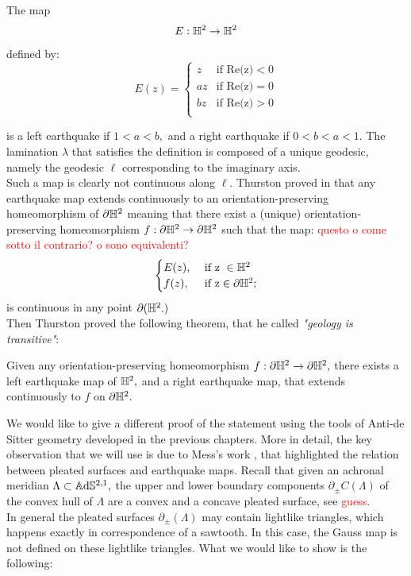 \begin{example}\label{simplequake}
The map 
\[
    E:\mathbb{H}^2\to\mathbb{H}^2
\]

defined by:
\[
  E(z)= \begin{cases}
    z & \text{if Re(z)}<0 \\
    az & \text{if Re(z)}=0 \\
    bz & \text{if Re(z)}>0 \\    
\end{cases}
\]

is a left earthquake if $1<a<b,$ and a right earthquake if $0<b<a<1$. The lamination $\lambda$ that satisfies the definition is composed of a unique geodesic, namely the geodesic $\ell$ corresponding to the imaginary axis. \\
Such a map is clearly not continuous along $\ell$.
Thurston proved in \cite{thurston1986earthquakes} that any earthquake map extends continuously to an orientation-preserving homeomorphism of $\partial\mathbb{H}^2$ meaning that there exist a (unique) orientation-preserving homeomorphism $f:\partial\mathbb{H}^2\to\partial\mathbb{H}^2$ such that the map: \textcolor{red}{questo o come sotto il contrario? o sono equivalenti?}
\[
    \begin{cases}
        E(z), &\text{ if z }\in \mathbb{H}^2\\
        f(z), &\text{ if z}\in \partial\mathbb{H}^2  ;\\
        
    \end{cases}
\]
is continuous in any point $\partial(\mathbb{H}^2.)$\\
Then Thurston proved the following theorem, that he called \textit{"geology is transitive"}:

\begin{theorem}
    Given any orientation-preserving homeomorphism $f:\partial\mathbb{H}^2\to\partial\mathbb{H}^2,$ there exists a left earthquake map of $\mathbb{H}^2,$ and a right earthquake map, that extends continuously to $f$ on $\partial\mathbb{H}^2.$
\end{theorem}
\end{example}

We would like to give a different proof of the statement using the tools of Anti-de Sitter geometry developed in the previous chapters. More in detail, the key observation that we will use is due to Mess's work \cite{Mess}, that highlighted the relation between pleated surfaces and earthquake maps. Recall that given an achronal meridian $\Lambda\subset\mathbb{A}\mathrm{d}\mathbb{S}^{2,1},$ the upper and lower boundary components $\partial_{\pm}C(\Lambda)$ of the convex hull of $\Lambda$ are a convex and a concave pleated surface, see \textcolor{red}{guess}.\\
In general the pleated surfaces $\partial_\pm(\Lambda)$ may contain lightlike triangles, which happens exactly in correspondence of a sawtooth. In this case, the Gauss map is not defined on these lightlike triangles. What we would like to show is the following: 

